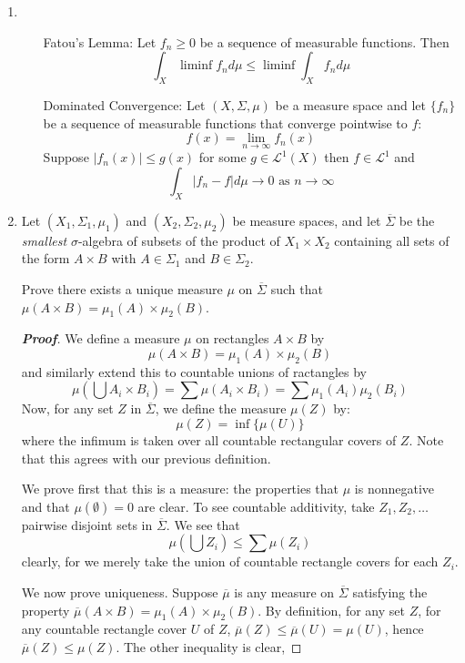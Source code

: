 \documentclass[12pt,leqno]{book}
\theoremstyle{definition}
\newenvironment{Proof}{\begin{proof}[\textnormal{\textbf{Proof}}]}{\end{proof}}
\begin{document}
\begin{enumerate}
\item\indent\begin{enumerate}
             \item [Fatou's Lemma:] Let $f_n\geq0$ be a sequence of measurable functions. Then \[\int_X\liminf f_nd\mu\leq\liminf\int_Xf_nd\mu\]
	     \item [Dominated Convergence:] Let $(X,\Sigma,\mu)$ be a measure space and let $\{f_n\}$ be a sequence of measurable functions that converge pointwise to $f$: \[f(x)=\lim_{n\to\infty}f_n(x)\] Suppose $|f_n(x)|\leq g(x)$ for some $g\in\mathcal{L}^1(X)$ then $f\in\mathcal{L}^1$ and \[\int_X|f_n-f|d\mu\to 0\text{ as }n\to\infty\]
            \end{enumerate}


\item Let $(X_1,\Sigma_1,\mu_1)$ and $(X_2,\Sigma_2,\mu_2)$ be measure spaces, and let $\overline{\Sigma}$ be the \textit{smallest} $\sigma$-algebra of subsets of the product of $X_1\times X_2$ containing all sets of the form $A\times B$ with $A\in\Sigma_1$ and $B\in\Sigma_2$.

Prove there exists a unique measure $\mu$ on $\overline{\Sigma}$ such that $\mu(A\times B)=\mu_1(A)\times\mu_2(B)$. 

\begin{Proof}
 We define a measure $\mu$ on rectangles $A\times B$ by \[\mu(A\times B)=\mu_1(A)\times\mu_2(B)\] and similarly extend this to countable unions of ractangles by \[\mu\left(\bigcup A_i\times B_i\right)=\sum\mu(A_i\times B_i)=\sum\mu_1(A_i)\mu_2(B_i)\] Now, for any set $Z$ in $\overline{\Sigma}$, we define the measure $\mu(Z)$ by: \[\mu(Z)=\inf\{\mu(U)\}\] where the infimum is taken over all countable rectangular covers of $Z$. Note that this agrees with our previous definition.

We prove first that this is a measure: the properties that $\mu$ is nonnegative and that $\mu(\emptyset)=0$ are clear. To see countable additivity, take $Z_1,Z_2,\hdots$ pairwise disjoint sets in $\overline{\Sigma}$. We see that \[\mu\left(\bigcup Z_i\right)\leq\sum\mu(Z_i)\] clearly, for we merely take the union of countable rectangle covers for each $Z_i$. 

We now prove uniqueness. Suppose $\overline{\mu}$ is any measure on $\overline{\Sigma}$ satisfying the property $\overline{\mu}(A\times B)=\mu_1(A)\times\mu_2(B)$. By definition, for any set $Z$, for any countable rectangle cover $U$ of $Z$, $\overline{\mu}(Z)\leq\overline{\mu}(U)=\mu(U)$, hence $\overline{\mu}(Z)\leq\mu(Z)$. The other inequality is clear, 
\end{Proof}


\end{enumerate}
\end{document}

